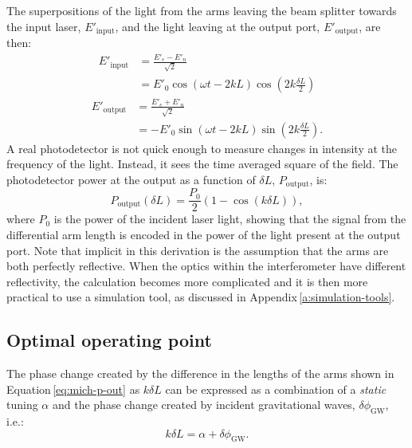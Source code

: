 The superpositions of the light from the arms leaving the beam splitter towards the input laser, $E'_{\text{input}}$, and the light leaving at the output port, $E'_{\text{output}}$, are then:
\begin{equation}
  \begin{split}
    E'_{\text{input}} &= \frac{E'_{e} - E'_{n}}{\sqrt{2}} \\
                      &= E'_0 \cos \left( \omega t - 2kL \right) \cos \left( 2k \frac{\delta L}{2} \right)
  \end{split}
\end{equation}
\begin{equation}
  \begin{split}
    E'_{\text{output}} &= \frac{E'_{e} + E'_{n}}{\sqrt{2}} \\
                       &= -E'_0 \sin \left( \omega t - 2kL \right) \sin \left( 2k \frac{\delta L}{2} \right).
  \end{split}
\end{equation}
A real photodetector is not quick enough to measure changes in intensity at the frequency of the light. Instead, it sees the time averaged square of the field. The photodetector power at the output as a function of $\delta L$, $P_{\text{output}}$, is:
\begin{equation}
  \label{eq:mich-p-out}
  P_{\text{output}} \left( \delta L \right) = \frac{P_0}{2} \left( 1 - \cos \left( k \delta L \right) \right),
\end{equation}
where $P_0$ is the power of the incident laser light, showing that the signal from the differential arm length is encoded in the power of the light present at the output port. Note that implicit in this derivation is the assumption that the arms are both perfectly reflective. When the optics within the interferometer have different reflectivity, the calculation becomes more complicated and it is then more practical to use a simulation tool, as discussed in Appendix\,\ref{a:simulation-tools}.

\subsection{\label{sec:operating-point}Optimal operating point}
The phase change created by the difference in the lengths of the arms shown in Equation\,\ref{eq:mich-p-out} as $k \delta L$ can be expressed as a combination of a \emph{static} tuning $\alpha$ and the phase change created by incident gravitational waves, $\delta \phi_{\text{GW}}$, i.e.:
\begin{equation}
  k \delta L = \alpha + \delta \phi_{\text{GW}}.
\end{equation}

